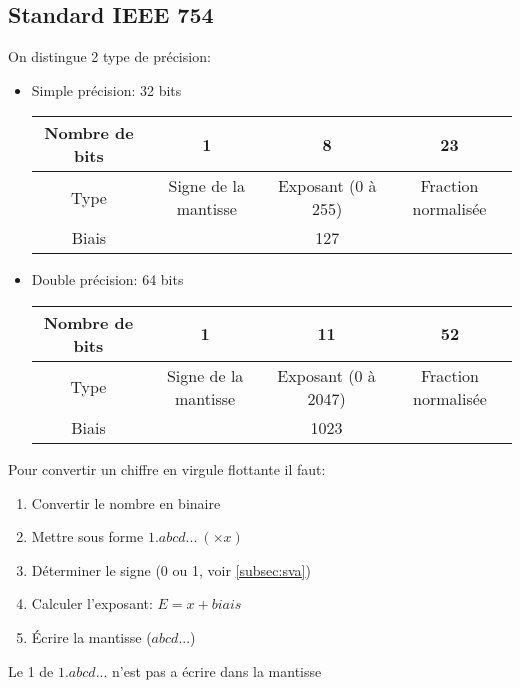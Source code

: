 \subsection{Standard IEEE 754}
On distingue 2 type de précision:
\begin{itemize}
	\item Simple précision: 32 bits\\
	\begin{center}
		\begin{tabular}{|c|c|c|c|}
			\hline
			Nombre de bits & 1 & 8 & 23\\
			\hline
			Type & Signe de la mantisse & Exposant (0 à 255) & Fraction normalisée\\
			\hline
			Biais & & 127 &\\
			\hline
		\end{tabular}
	\end{center}
	\item Double précision: 64 bits\\
	\begin{center}
		\begin{tabular}{|c|c|c|c|}
			\hline
			Nombre de bits & 1 & 11 & 52\\
			\hline
			Type & Signe de la mantisse & Exposant (0 à 2047) & Fraction normalisée\\
			\hline
			Biais & & 1023 &\\
			\hline
		\end{tabular}
	\end{center}
\end{itemize}
Pour convertir un chiffre en virgule flottante il faut:
\begin{enumerate}
	\item Convertir le nombre en binaire
	\item Mettre sous forme $1.abcd...\ (\times x)$
	\item Déterminer le signe (0 ou 1, voir \autoref{subsec:sva})
	\item Calculer l'exposant: $E=x+biais$
	\item Écrire la mantisse ($abcd...$) 
\end{enumerate}
\danger Le 1 de $1.abcd...$ n'est pas a écrire dans la mantisse
